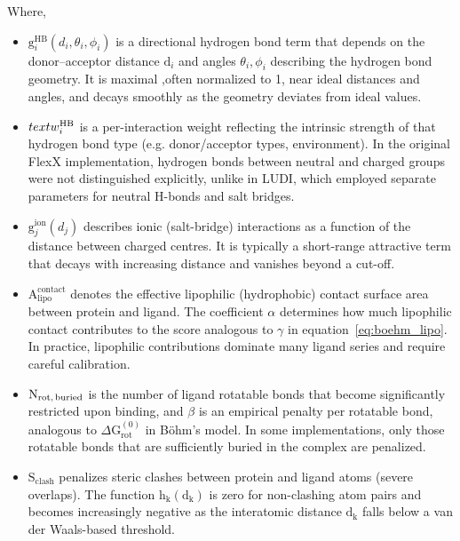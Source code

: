 \documentclass[12pt, a4paper]{article}
\begin{document}
Where,
\begin{itemize}
  \item $\text{g}_i^{\text{HB}}(d_i, \theta_i, \phi_i)$ is a directional hydrogen bond term that depends on the donor--acceptor distance $\text{d}_i$ and angles $\theta_i, \phi_i$ describing the hydrogen bond geometry. It is maximal ,often normalized to 1, near ideal distances and angles, and decays smoothly as the geometry deviates from ideal values.

  \item $\\text{w}_i^{\text{HB}}$ is a per-interaction weight reflecting the intrinsic strength of that hydrogen bond type (e.g.  donor/acceptor types, environment). In the original FlexX implementation, hydrogen bonds between neutral and charged groups were not distinguished explicitly, unlike in LUDI, which employed separate parameters for neutral H-bonds and salt bridges.\cite{CH7_bohm1994}

  \item $\text{g}_j^{\text{ion}}(d_j)$ describes ionic (salt-bridge) interactions as a function of the distance between charged centres. It is typically a short-range attractive term that decays with increasing distance and vanishes beyond a cut-off.

  \item $\text{A}_{\text{lipo}}^{\text{contact}}$ denotes the effective lipophilic (hydrophobic) contact surface area between protein and ligand. The coefficient \(\alpha\) determines how much lipophilic contact contributes to the score analogous to $\gamma$ in equation~\eqref{eq:boehm_lipo}. In practice, lipophilic contributions dominate many ligand series and require careful calibration.\cite{CH7_bohm1994,CH7_stahl}

  \item $\text{N}_{\text{rot,\,buried}}$ is the number of ligand rotatable bonds that become significantly restricted upon binding, and $\beta$ is an empirical penalty per rotatable bond, analogous to $\Delta \text{G}_{\text{rot}}^{(0)}$ in B{\"o}hm's model. In some implementations, only those rotatable bonds that are sufficiently buried in the complex are penalized.

  \item $\text{S}_{\text{clash}}$ penalizes steric clashes between protein and ligand atoms (severe overlaps). The function
        $\text{h}_\text{k}(\text{d}_\text{k})$ is zero for non-clashing atom pairs and becomes increasingly negative as the interatomic distance $\text{d}_\text{k}$ falls below a van der Waals-based threshold.
\end{itemize}
\end{document}
